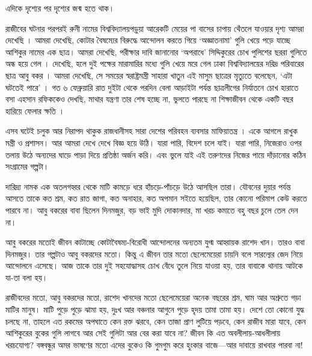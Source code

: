 \documentclass[a4paper,10 pt,addpoints]{article}
\begin{document}
এদিকে দৃশ্যের পর দৃশ্যের জন্ম হতে থাক। 


রাজীবের ঘটনার পরপরই রুনী নামের বিশ্ববিদ্যালয়পড়ুয়া আরেকটি মেয়ের পা বাসের চাপায় থেঁতলে যাওয়ার দৃশ্য আমরা দেখেছি  । আমরা দেখেছি, কোটার বৈষম্যের বিরুদ্ধে আন্দোলন করতে গিয়ে ‘অজ্ঞাতনামা’ গুলি খেয়ে পড়ে যাচ্ছে আশিকুর নামের এক ছাত্র। আমরা দেখেছি, পরীক্ষার দাবি জানানোর ‘অপরাধে’ সিদ্দিকুরের চোখ পুলিশের ছররা গুলিতে অন্ধ হয়ে গেল  । দেখেছি, হলে দুই পক্ষের মারামারির মধ্যে গুলি খেয়ে মরে গেল ঢাকা বিশ্ববিদ্যালয়ের দরিদ্র পরিবারের ছাত্র আবু বকর । আমরা দেখেছি, সে সময়ের স্বরাষ্ট্রমন্ত্রী সাহারা খাতুন এই মাসুম ছাত্রের মৃত্যুতে বলেছেন, ‘এটা ঘটতেই পারে’  । গত ৬ ফেব্রুয়ারি রাত দুইটা থেকে পরদিন বেলা আড়াইটা পর্যন্ত ছাত্রলীগের নির্যাতনে চোখ হারাতে বসা এহসান রফিককেও দেখছি, মাথার যন্ত্রণা তার শেষ হচ্ছে না, ভুলতে পারছে না শিক্ষাজীবন থেকে একটি বছর হারিয়ে ফেলার ক্ষতি  ।

এসব ঘটেই চলুক আর নিরাপদ থাকুক রাজধানীসহ সারা দেশের পরিবহন ব্যবসার মাফিয়াতন্ত্র । একে আগলে রাখুক মন্ত্রী ও প্রশাসন। আর আমরা দেখে দেখে বিজ্ঞ হয়ে উঠি। যারা পারি, বিদেশ চলে যাই। যারা পারি, নিজেরাও ওপর তলায় উঠে অন্যদের ঘাড়ে পাড়া দিয়ে প্রতিষ্ঠা অর্জন করি। এবং ভুলে যাই এই তরুণদের নিজের পায়ে দাঁড়ানোর কঠিন সংগ্রামের গল্পটা। 

দারিদ্র্য নামক এক অতলগহ্বর থেকে মাটি কামড়ে ধরে হাঁচড়ে-পাঁচড়ে উঠে আসছিল তারা। যৌবনের দুয়ার পর্যন্ত আসতে তাকে কত শ্রম, কত রাত জাগা, কত অনাহার, কত অপমান সইতে হয়েছিল, তার কোনো পরিমাপ কেউ করতে পারবে না। আবু বকরের বাবা ছিলেন দিনমজুর, বড় ভাই মুদি দোকানদার, মা খরচ কমাতে বহু বছর চুলে তেল দেন না।

আবু বকরের মতোই জীবন কাটাচ্ছে কোটাবৈষম্য-বিরোধী আন্দোলনের অন্যতম যুগ্ম আহ্বায়ক রাশেদ খান। তারও বাবা দিনমজুর। তার গল্পটাও আবু বকরদের মতো। কিন্তু এ জীবন তার মতো ছেলেমেয়েরা চায়নি বলে সারল্যের জেদ নিয়ে আন্দোলনে এসেছে। আজ তাকে তার দুই সহযোদ্ধাসহ চোখ বেঁধে তুলে নিয়ে যাওয়া হয়, তার বাবাকে থানায় আটকে যা-তা বলা হয়।

রাজীবদের মতো, আবু বকরদের মতো, রাশেদ খানদের মতো ছেলেমেয়েরা অনেক বছরের শ্রম, ঘাম আর অশ্রুতে গড়া মাটির মানুষ। মাটি পুড়ে পুড়ে ঝামা হয়, দুঃখ আর বঞ্চনার আগুনে পুড়ে হৃদয় তামা তামা হয়। দেশে তো কোনো যুদ্ধ চলছে না, তাহলে এত রকমের অপঘাতে কেন রক্ত ঝরবে, কেন তাজা প্রাণ লুটিয়ে পড়বে, কেন রাজীব মারা যাবে, কেন আশিকুরের বুকের গুলি লাগবে আর সেই গুলিটা আর বের করা যাবে না? জীবন কি এত অবলীলায়-আধলীলায় খরচযোগ্য? বঙ্গবন্ধুর অমর ভাষণের মতো এদের বুকেও কি গুমগুম করে হুংকার বাজে—আর দাবায়ে রাখবার পারবা না!
\end{document}
